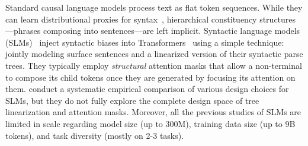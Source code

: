 \documentclass[11pt]{article}
\begin{document}
Standard causal language models process text as flat token sequences. While they can learn distributional proxies for syntax~\cite{hu-etal-2020-systematic}, hierarchical constituency structures---phrases composing into sentences---are left implicit. %
Syntactic language models (SLMs)~\cite{sartran-etal-2022-transformer, hu-etal-2024-generative, murty-etal-2023-pushdown, zhao-etal-2024-dependency, huang2026GiLT} inject syntactic biases into Transformers~\cite{vaswani2017attention} using a simple technique: jointly modeling surface sentences and a linearized version of their syntactic parse trees. 
They typically employ \emph{structural} attention masks that allow a non-terminal to compose its child tokens once they are generated by focusing its attention on them.
\citet{zhao-etal-2025-systematic} conduct a systematic empirical comparison of various design choices for SLMs, but they do not fully explore the complete design space of tree linearization and attention masks.
Moreover, all the previous studies of SLMs are limited in scale regarding model size (up to 300M), training data size (up to 9B tokens), and task diversity (mostly on 2-3 tasks).
\end{document}
